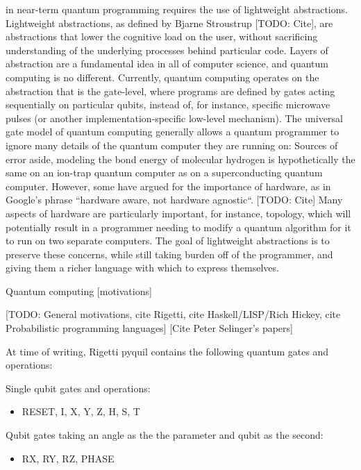 \documentclass[journal]{IEEEtran}
\begin{document}
 in near-term quantum programming requires the use of lightweight abstractions. 
Lightweight abstractions, as defined by Bjarne Stroustrup [TODO: Cite], are abstractions that lower the cognitive load on the user, without sacrificing understanding of the underlying processes behind particular code.
Layers of abstraction are a fundamental idea in all of computer science, and quantum computing is no different.
Currently, quantum computing operates on the abstraction that is the gate-level, where programs are defined by gates acting sequentially on particular qubits, instead of, for instance, specific microwave pulses (or another implementation-specific low-level mechanism).
The universal gate model of quantum computing generally allows a quantum programmer to ignore many details of the quantum computer they are running on: Sources of error aside, modeling the bond energy of molecular hydrogen is hypothetically the same on an ion-trap quantum computer as on a superconducting quantum computer.
However, some have argued for the importance of hardware, as in Google's phrase ``hardware aware, not hardware agnostic``. [TODO: Cite]
Many aspects of hardware are particularly important, for instance, topology, which will potentially result in a programmer needing to modify a quantum algorithm for it to run on two separate computers.
The goal of lightweight abstractions is to preserve these concerns, while still taking burden off of the programmer, and giving them a richer language with which to express themselves.

Quantum computing [motivations]

[TODO: General motivations, cite Rigetti, cite Haskell/LISP/Rich Hickey, cite Probabilistic programming languages]
[Cite Peter Selinger's papers]

At time of writing, Rigetti pyquil contains the following quantum gates and operations:

Single qubit gates and operations:

\begin{itemize}
    \item RESET, I, X, Y, Z, H, S, T
\end{itemize}

Qubit gates taking an angle as the the parameter and qubit as the second:

\begin{itemize}
    \item RX, RY, RZ, PHASE
\end{itemize}
\end{document}
